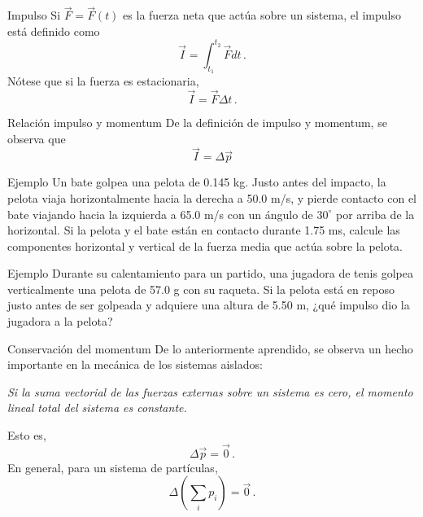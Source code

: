   \begin{frame}{Impulso}
      Si $\vec{F}=\vec{F}(t)$ es la fuerza neta que actúa sobre un sistema, el impulso está definido como \begin{equation*}
          \vec{I}=\int_{t_1}^{t_2}\vec{F}dt\,.
      \end{equation*} Nótese que si la fuerza es estacionaria, \begin{equation*}
          \vec{I}=\vec{F}\Delta t\,.
      \end{equation*}
  \end{frame}

  \begin{frame}{Relación impulso y momentum}
      De la definición de impulso y momentum, se observa que \begin{equation*}
          \vec{I}=\Delta\vec{p}
      \end{equation*}
  \end{frame}

    \begin{frame}{Ejemplo}
        Un bate golpea una pelota de 0.145 kg. Justo antes del impacto, la pelota viaja horizontalmente hacia la derecha a 50.0 m/s, y pierde contacto con el bate viajando hacia la izquierda a 65.0 m/s con un ángulo de $30^\circ$ por arriba de la horizontal. Si la pelota y el bate están en contacto durante 1.75 ms, calcule las componentes horizontal y vertical de la fuerza media que actúa sobre la pelota.
    \end{frame}

    \begin{frame}{Ejemplo}
        Durante su calentamiento para un partido, una jugadora de tenis golpea verticalmente una pelota de 57.0 g con su raqueta. Si la pelota está en reposo justo antes de ser golpeada y adquiere una altura de 5.50 m, ¿qué impulso dio la jugadora a la pelota?
    \end{frame}

    \begin{frame}{Conservación del momentum}
        De lo anteriormente aprendido, se observa un hecho importante en la mecánica de los sistemas aislados:
        
        \vspace{1em} \textit{Si la suma vectorial de las fuerzas externas sobre un sistema es cero, el momento lineal total del sistema es constante.}

        \vspace{1em} Esto es, \begin{equation*}
            \Delta\vec{p}=\vec{0}\,.
        \end{equation*} En general, para un sistema de partículas, \begin{equation*}
            \Delta \left(\sum_i p_i\right) = \vec{0}\,.
        \end{equation*}
    \end{frame}

